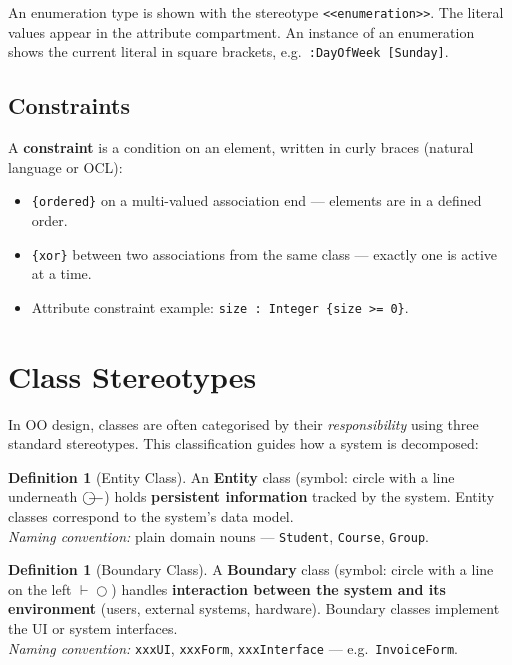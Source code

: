 \documentclass[11pt, a4paper, notitlepage]{report}
\theoremstyle{definition}
\newtheorem{definition}[theorem]{Definition}
\theoremstyle{remark}
\theoremstyle{definition}
\begin{document}
An enumeration type is shown with the stereotype \texttt{<<enumeration>>}.
The literal values appear in the attribute compartment.  An instance of an
enumeration shows the current literal in square brackets, e.g.\
\texttt{:DayOfWeek [Sunday]}.

\subsection{Constraints}

A \textbf{constraint} is a condition on an element, written in curly braces
(natural language or OCL):

\begin{itemize}[noitemsep]
  \item \texttt{\{ordered\}} on a multi-valued association end --- elements
        are in a defined order.
  \item \texttt{\{xor\}} between two associations from the same class ---
        exactly one is active at a time.
  \item Attribute constraint example: \texttt{size : Integer \{size >= 0\}}.
\end{itemize}

\section{Class Stereotypes}
\label{sec:ch6-stereotypes}

In OO design, classes are often categorised by their \emph{responsibility}
using three standard stereotypes.  This classification guides how a system is
decomposed:

\begin{definition}[Entity Class]
\label{def:ch6-entity}
An \textbf{Entity} class (symbol: circle with a line underneath $\bigcirc\!\!\!\rule[0.5ex]{1em}{0.4pt}$)
holds \textbf{persistent information} tracked by the system.  Entity classes
correspond to the system's data model.\\
\textit{Naming convention:} plain domain nouns ---
\texttt{Student}, \texttt{Course}, \texttt{Group}.
\end{definition}

\begin{definition}[Boundary Class]
\label{def:ch6-boundary}
A \textbf{Boundary} class (symbol: circle with a line on the left
$\vdash\!\bigcirc$) handles \textbf{interaction between the system and its
environment} (users, external systems, hardware).  Boundary classes
implement the UI or system interfaces.\\
\textit{Naming convention:} \texttt{xxxUI}, \texttt{xxxForm},
\texttt{xxxInterface} --- e.g.\ \texttt{InvoiceForm}.
\end{definition}
\end{document}
